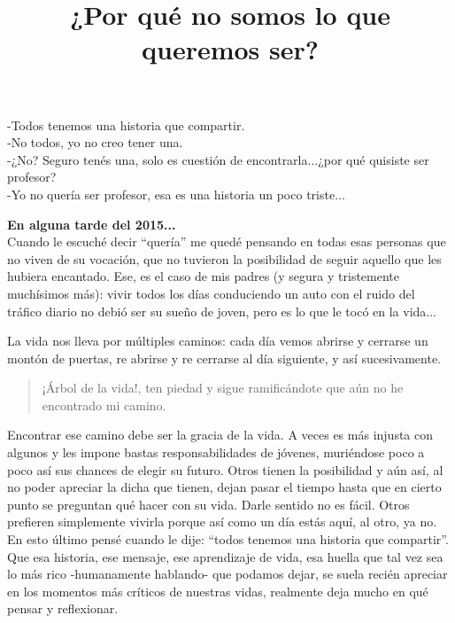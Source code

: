 \documentclass[12t, a4 paper]{article}
\title{¿Por qu\'e no somos lo que queremos ser?}
\date{}
\begin{document}
\maketitle

\begin{flushright}
-Todos tenemos una historia que compartir. \\
-No todos, yo no creo tener una. \\
-¿No? Seguro ten\'es una, solo es cuesti\'on de encontrarla...¿por qu\'e quisiste ser profesor?\\
 -Yo no quer\'ia ser profesor, esa es una historia un poco triste...\\
 \end{flushright}

\textbf{En alguna tarde del 2015...} \\

Cuando le escuch\'e decir “quer\'ia” me qued\'e pensando en todas esas personas que no viven de su vocaci\'on, que no tuvieron la posibilidad de seguir aquello que les hubiera encantado. Ese, es el caso de mis padres (y segura y tristemente much\'isimos m\'as): vivir todos los d\'ias conduciendo un auto con el ruido del tr\'afico diario no debi\'o ser su sue\~no de joven, pero es lo que le toc\'o en la vida...

La vida nos lleva por m\'ultiples caminos: cada d\'ia vemos abrirse y cerrarse un mont\'on de puertas, re abrirse y re cerrarse al d\'ia siguiente, y as\'i sucesivamente.

	\begin{quote} 
	¡Árbol de la vida!, ten piedad y sigue ramific\'andote que a\'un no he encontrado mi camino.
	\end{quote} 

\vspace{2mm}
Encontrar ese camino debe ser la gracia de la vida. A veces es m\'as injusta con algunos y les impone bastas responsabilidades de j\'ovenes, muri\'endose poco a poco as\'i sus chances de elegir su futuro. Otros tienen la posibilidad y a\'un as\'i, al no poder apreciar la dicha que tienen, dejan pasar el tiempo hasta que en cierto punto se preguntan qu\'e hacer con su vida. Darle sentido no es f\'acil. Otros prefieren simplemente vivirla porque as\'i como un d\'ia est\'as aqu\'i, al otro, ya no. En esto \'ultimo pens\'e cuando le dije: “todos tenemos una historia que compartir”. Que esa historia, ese mensaje, ese aprendizaje de vida, esa huella que tal vez sea lo m\'as rico -humanamente hablando- que podamos dejar, se suela reci\'en apreciar en los momentos m\'as cr\'iticos de nuestras vidas, realmente deja mucho en qu\'e pensar y reflexionar.
\end{document}
